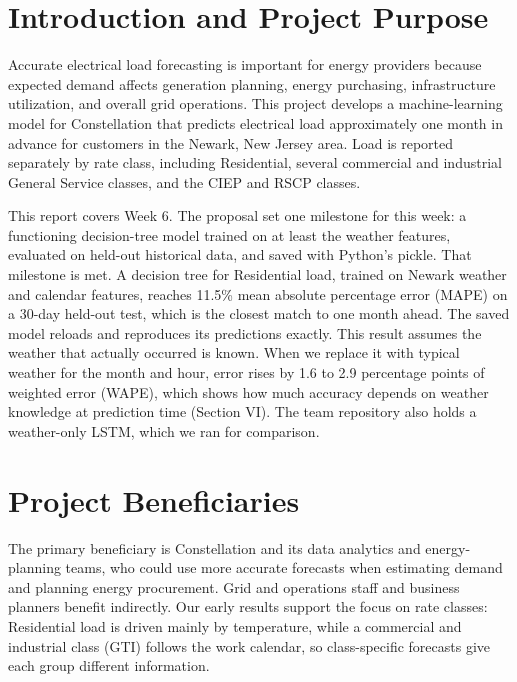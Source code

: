 \documentclass[10pt,letterpaper,twocolumn]{article}
\begin{document}

\section{Introduction and Project Purpose}
Accurate electrical load forecasting is important for energy providers because expected demand affects generation planning, energy purchasing, infrastructure utilization, and overall grid operations. This project develops a machine-learning model for Constellation that predicts electrical load approximately one month in advance for customers in the Newark, New Jersey area. Load is reported separately by rate class, including Residential, several commercial and industrial General Service classes, and the CIEP and RSCP classes.

This report covers Week 6. The proposal set one milestone for this week: a functioning decision-tree model trained on at least the weather features, evaluated on held-out historical data, and saved with Python's pickle. That milestone is met. A decision tree for Residential load, trained on Newark weather and calendar features, reaches 11.5\% mean absolute percentage error (MAPE) on a 30-day held-out test, which is the closest match to one month ahead. The saved model reloads and reproduces its predictions exactly. This result assumes the weather that actually occurred is known. When we replace it with typical weather for the month and hour, error rises by 1.6 to 2.9 percentage points of weighted error (WAPE), which shows how much accuracy depends on weather knowledge at prediction time (Section VI). The team repository also holds a weather-only LSTM, which we ran for comparison.

\section{Project Beneficiaries}
The primary beneficiary is Constellation and its data analytics and energy-planning teams, who could use more accurate forecasts when estimating demand and planning energy procurement. Grid and operations staff and business planners benefit indirectly. Our early results support the focus on rate classes: Residential load is driven mainly by temperature, while a commercial and industrial class (GTI) follows the work calendar, so class-specific forecasts give each group different information.
\end{document}
